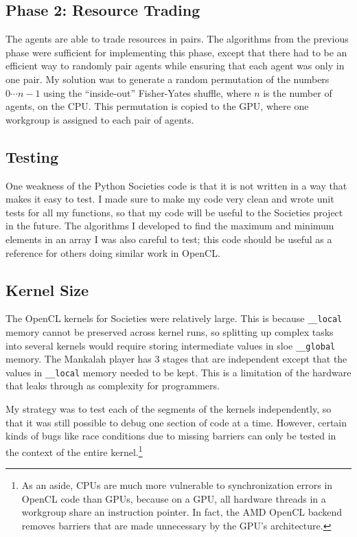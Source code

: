 \documentclass{article}
\begin{document}
\subsection{Phase 2: Resource Trading}
The agents are able to trade resources in pairs. The algorithms from the previous phase were sufficient for implementing this phase, except that there had to be an efficient way to randomly pair agents while ensuring that each agent was only in one pair. My solution was to generate a random permutation of the numbers $0 \cdots n-1$ using the ``inside-out'' Fisher-Yates shuffle, where $n$ is the number of agents, on the CPU. This permutation is copied to the GPU, where one workgroup is assigned to each pair of agents.

\subsection{Testing}
One weakness of the Python Societies code is that it is not written in a way that makes it easy to test. I made sure to make my code very clean  and wrote unit tests for all my functions, so that my code will be useful to the Societies project in the future. The algorithms I developed to find the maximum and minimum elements in an array I was also careful to test; this code should be useful as a reference for others doing similar work in OpenCL.

\subsection{Kernel Size}
The OpenCL kernels for Societies were relatively large. This is because \texttt{\_\_local} memory cannot be preserved across kernel runs, so splitting up complex tasks into several kernels would require storing intermediate values in sloe \texttt{\_\_global} memory. The Mankalah player has 3 stages that are independent except that the values in \texttt{\_\_local} memory needed to be kept. This is a limitation of the hardware that leaks through as complexity for programmers.

My strategy was to test each of the segments of the kernels independently, so that it was still possible to debug one section of code at a time. However, certain kinds of bugs like race conditions due to missing barriers can only be tested in the context of the entire kernel.\footnote{As an aside, CPUs are much more vulnerable to synchronization errors in OpenCL code than GPUs, because on a GPU, all hardware threads in a workgroup share an instruction pointer. In fact, the AMD OpenCL backend removes barriers that are made unnecessary by the GPU's architecture.}
\end{document}
